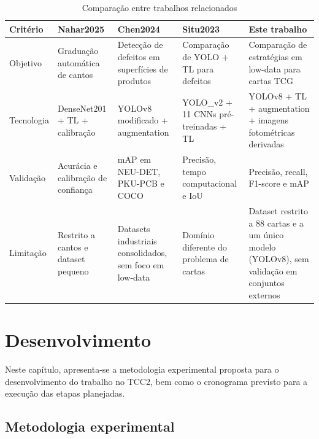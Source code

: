\documentclass[
    12pt,                %
    openright,           %
    oneside,             %
    a4paper,             %
    english,             %
    brazil               %
]{abntex2}
\begin{document}
\begin{table}[htb]
    \centering
    \caption{Comparação entre trabalhos relacionados}
    \label{tab:trabalhos_relacionados}
    \scriptsize
    \begin{tabular}{p{2.2cm}|p{2.6cm}|p{2.8cm}|p{2.8cm}|p{2.8cm}}
        \toprule
        \textbf{Critério} & \textbf{Nahar2025} & \textbf{Chen2024} & \textbf{Situ2023} & \textbf{Este trabalho} \\
        \midrule
        Objetivo & Graduação automática de cantos & Detecção de defeitos em superfícies de produtos & Comparação de YOLO + TL para defeitos & Comparação de estratégias em low-data para cartas TCG \\
        \midrule
        Tecnologia & DenseNet201 + TL + calibração & YOLOv8 modificado + augmentation & YOLO\_v2 + 11 CNNs pré-treinadas + TL & YOLOv8 + TL + augmentation + imagens fotométricas derivadas \\
        \midrule
        Validação & Acurácia e calibração de confiança & mAP em NEU-DET, PKU-PCB e COCO & Precisão, tempo computacional e IoU & Precisão, recall, F1-score e mAP \\
        \midrule
        Limitação & Restrito a cantos e dataset pequeno & Datasets industriais consolidados, sem foco em low-data & Domínio diferente do problema de cartas & Dataset restrito a 88 cartas e a um único modelo (YOLOv8), sem validação em conjuntos externos \\
        \bottomrule
    \end{tabular}
\end{table}

\chapter{Desenvolvimento}
\label{cap:desenvolvimento}

Neste capítulo, apresenta-se a metodologia experimental proposta para o desenvolvimento do trabalho no TCC2, bem como o cronograma previsto para a execução das etapas planejadas.
\section{Metodologia experimental}
\label{sec:metodologia_experimental}
\end{document}
